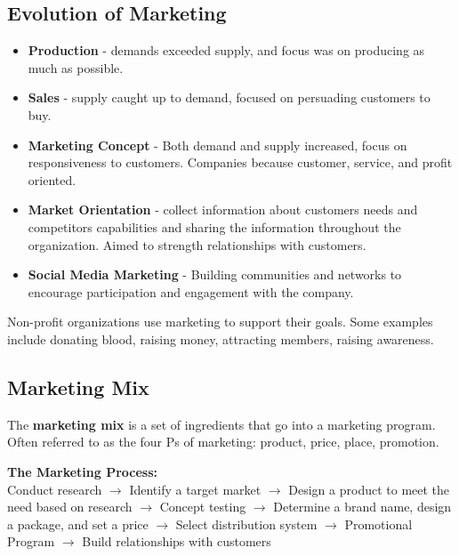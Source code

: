 \documentclass[english, 12pt]{article}
\begin{document}
\subsection*{Evolution of Marketing}
\begin{itemize}
\item \textbf{Production} - demands exceeded supply, and focus was on producing as much as possible.
\item \textbf{Sales} - supply caught up to demand, focused on persuading customers to buy.
\item \textbf{Marketing Concept} - Both demand and supply increased, focus on responsiveness to customers. Companies because customer, service, and profit oriented.
\item \textbf{Market Orientation} - collect information about customers needs and competitors capabilities and sharing the information throughout the organization. Aimed to strength relationships with customers.
\item \textbf{Social Media Marketing} - Building communities and networks to encourage participation and engagement with the company.
\end{itemize}
Non-profit organizations use marketing to support their goals. Some examples include donating blood, raising money, attracting members, raising awareness.
\subsection{Marketing Mix}
\begin{defn}
The \textbf{marketing mix} is a set of ingredients that go into a marketing program. Often referred to as the four Ps of marketing: product, price, place, promotion.
\end{defn}
\begin{exmp}

\textbf{The Marketing Process:}\\
Conduct research
$\rightarrow$ Identify a target market
$\rightarrow$ Design a product to meet the need based on research
$\rightarrow$ Concept testing
$\rightarrow$ Determine a brand name, design a package, and set a price
$\rightarrow$ Select distribution system
$\rightarrow$ Promotional Program
$\rightarrow$ Build relationships with customers
\end{exmp}
\end{document}
